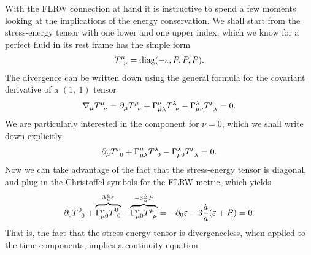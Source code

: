 With the FLRW connection at hand it is instructive to spend a few moments looking
at the implications of the energy conservation. We shall start from the stress-energy
tensor with one lower and one upper index, which we know for a perfect fluid in its
rest frame has the simple form
\begin{align*}
  T^\mu_{\phantom{\mu}\nu} = \text{diag}(-\varepsilon, P, P, P).
\end{align*}
The divergence can be written down using the general formula for the covariant derivative
of a $(1,~1)$ tensor
\begin{align*}
  \nabla_\mu T^\mu_{\phantom{\mu}\nu} = \partial_{\mu} T^\mu_{\phantom{\mu}\nu} +
  \Gamma^{\mu}_{\mu\lambda} T^\lambda_{\phantom{\lambda}\nu} -
  \Gamma^{\lambda}_{\mu\nu} T^\mu_{\phantom{\mu}\lambda} = 0.
\end{align*}
We are particularly interested in the component for $\nu = 0$, which we shall write
down explicitly
\begin{align*}
  \partial_{\mu} T^\mu_{\phantom{\mu}0} +
  \Gamma^{\mu}_{\mu\lambda} T^\lambda_{\phantom{\lambda}0} -
  \Gamma^{\lambda}_{\mu0} T^\mu_{\phantom{\mu}\lambda} = 0.
\end{align*}
Now we can take advantage of the fact that the stress-energy tensor is diagonal,
and plug in the Christoffel symbols for the FLRW metric, which yields
\begin{align*}
  \partial_{0} T^0_{\phantom{\mu}0} +
  \overbrace{\Gamma^{\mu}_{\mu 0} T^0_{\phantom{0}0}}^{3 \frac{\dot{a}}{a} \varepsilon} -
  \overbrace{\Gamma^{\mu}_{\mu0} T^\mu_{\phantom{\mu}\mu}}^{-3\frac{\dot{a}}{a}P} =
  -\partial_{0}\varepsilon - 3 \frac{\dot{a}}{a} (\varepsilon + P) = 0.
\end{align*}
That is, the fact that the stress-energy tensor is divergenceless, when applied to
the time components, implies a continuity equation
